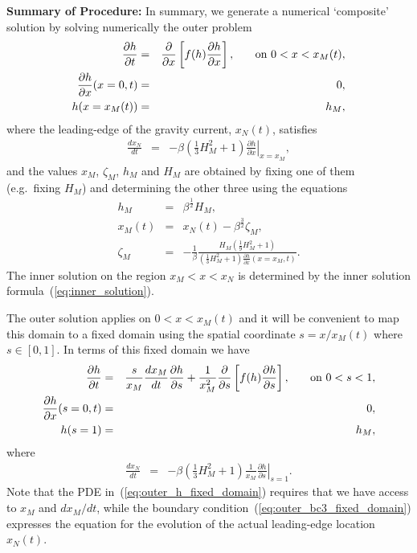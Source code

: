 \documentclass[11pt]{article}
\newcommand{\bea}{\begin{eqnarray}}
\newcommand{\eea}{\end{eqnarray}}
\begin{document}
{\bf Summary of Procedure:} In summary, we generate a numerical `composite' solution by solving numerically the outer problem
\bea
\label{eq:outer_h}
\frac{\partial h}{\partial t} & = & \frac{\partial}{\partial x} \left[ f(h)\frac{\partial h}{\partial x} \right], \hspace{0.25in} \mbox{on $0 < x < x_M(t)$},\\
\label{eq:outer_bc1}
\frac{\partial h}{\partial x}(x=0,t) & = & 0,\\
\label{eq:outer_bc2}
h(x=x_M(t)) & = & h_M,
\eea
where the leading-edge of the gravity current, $x_N(t)$, satisfies
\bea
\label{eq:outer_bc3}
\frac{dx_N}{dt} & = & - \beta \left( \frac{1}{3} H^2_M + 1 \right) \left. \frac{\partial h}{\partial x} \right|_{x=x_M},
\eea
and the values $x_M$, $\zeta_M$, $h_M$ and $H_M$ are obtained by fixing one of them (e.g.~fixing $H_M$) and determining the other three using the equations
\bea
\label{eq:hM}
h_M & = & \beta^{\frac{1}{2}} H_M, \\
\label{eq:xM}
x_M(t) & = & x_N(t) - \beta^{\frac{3}{2}} \zeta_M,\\
\label{eq:zM}
\zeta_M & = & - \frac{1}{\beta} \frac{H_M \left( \frac{1}{9} H_M^2 + 1 \right) }{ \left( \frac{1}{3} H_M^2 + 1 \right) \frac{\partial h}{\partial x}(x=x_M,t) }.
\eea
The inner solution on the region $x_M < x < x_N$ is determined by the inner solution formula~(\ref{eq:inner_solution}).

The outer solution applies on $0 < x < x_M(t)$ and it will be convenient to map this domain to a fixed domain using the spatial coordinate $s=x/x_M(t)$ where $s \in [0,1]$.  In terms of this fixed domain we have
\bea
\label{eq:outer_h_fixed_domain}
\frac{\partial h}{\partial t} & = & \frac{s}{x_M} \frac{dx_M}{dt} \frac{\partial h}{\partial s} + \frac{1}{x_M^2} \frac{\partial}{\partial s} \left[ f(h)\frac{\partial h}{\partial s} \right], \hspace{0.25in} \mbox{on $0 < s < 1$},\\
\label{eq:outer_bc1_fixed_domain}
\frac{\partial h}{\partial x}(s=0,t) & = & 0,\\
\label{eq:outer_bc2_fixed_domain}
h(s=1) & = & h_M,
\eea
where
\bea
\label{eq:outer_bc3_fixed_domain}
\frac{dx_N}{dt} & = & - \beta \left( \frac{1}{3} H^2_M + 1 \right) \frac{1}{x_M} \left. \frac{\partial h}{\partial s} \right|_{s=1}.
\eea
Note that the PDE in~(\ref{eq:outer_h_fixed_domain}) requires that we have access to $x_M$ and $dx_M/dt$, while the boundary condition~(\ref{eq:outer_bc3_fixed_domain}) 
expresses the equation for the evolution of the actual leading-edge location $x_N(t)$.
\end{document}
